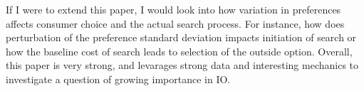 \documentclass[11pt]{article}
\theoremstyle{definition}
\theoremstyle{remark}
\begin{document}
If I were to extend this paper, I would look into how variation in preferences affects consumer choice and the actual search process. For instance, how does perturbation of the preference standard
deviation impacts initiation of search or how the baseline cost of search leads to selection of the outside option. Overall, this paper is very strong, and levarages strong data and interesting
mechanics to investigate a question of growing importance in IO.
\end{document}

